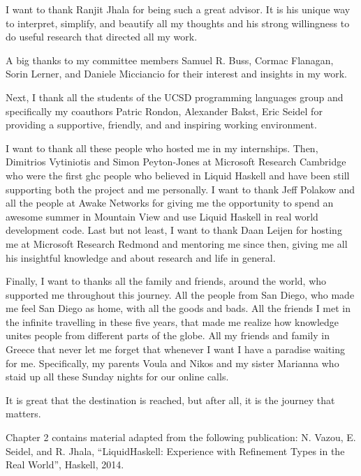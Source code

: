 I want to thank Ranjit Jhala for being such a great advisor. 
%
It is his unique way to interpret, simplify, and beautify all my 
thoughts
and his strong willingness to do useful research 
that directed all my work. 

A big thanks to my committee members 
Samuel R. Buss, 
Cormac Flanagan,
Sorin Lerner, 
and Daniele Micciancio for their interest and insights in my work. 

Next, I thank all the students of the UCSD programming languages group and specifically my coauthors
Patric Rondon,
Alexander Bakst, 
Eric Seidel 
for providing a supportive, friendly, and and inspiring working environment.

I want to thank all these people who hosted me in my internships. 
%
%
Then, Dimitrios Vytiniotis and Simon Peyton-Jones
at Microsoft Research Cambridge
who were the first ghc people who believed in Liquid Haskell
and have been still supporting both the project and me personally.
%
I want to thank Jeff Polakow and all the people at Awake Networks 
for giving me the opportunity to spend an awesome summer in Mountain View 
and use Liquid Haskell in real world development code. 
%
Last but not least, 
I want to thank Daan Leijen 
for hosting me at Microsoft Research Redmond 
and mentoring me since then, giving me all his insightful
knowledge and  about research and life in general.

Finally, I want to thanks all the family and friends, around the world,
who supported me throughout this journey.
%
All the people from San Diego, 
who made me feel San Diego as home, with all the goods and bads. 
%
All the friends I met in the infinite travelling in these five years, 
that made me realize how knowledge unites people from different parts of the globe.
%
All my friends and family in Greece that never let me forget that
whenever I want I have a paradise waiting for me.  
%
Specifically, my parents Voula and Nikos and my sister Marianna
who staid up all these Sunday nights for our online calls. 

It is great that the destination is reached, 
but after all, it is the journey that matters. 

\newpage

Chapter 2 contains material adapted from the following publication:
\noindent N. Vazou, E. Seidel, and R. Jhala,
``LiquidHaskell: Experience with Refinement Types in the Real World'', 
Haskell, 2014.\\

